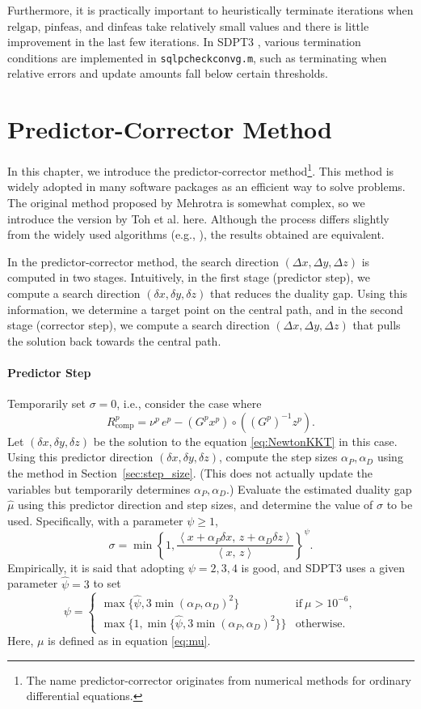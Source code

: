 \documentclass{scrartcl}
\newcommand{\inprod}[2]{\left\langle #1, \, #2 \right\rangle}
\begin{document}
Furthermore, it is practically important to heuristically terminate iterations when $\mathrm{relgap}$, $\mathrm{pinfeas}$, and $\mathrm{dinfeas}$ take relatively small values and there is little improvement in the last few iterations.
In SDPT3 \cite{toh1999}, various termination conditions are implemented in \texttt{sqlpcheckconvg.m}, such as terminating when relative errors and update amounts fall below certain thresholds.




\section{Predictor-Corrector Method}
In this chapter, we introduce the predictor-corrector method\footnote{The name predictor-corrector originates from numerical methods for ordinary differential equations.}.
This method is widely adopted in many software packages as an efficient way to solve problems.
The original method proposed by Mehrotra \cite{Mehrotra1992} is somewhat complex, so we introduce the version by Toh et al. \cite{toh1999} here.
Although the process differs slightly from the widely used algorithms (e.g., \cite{Wright1997}), the results obtained are equivalent.

In the predictor-corrector method, the search direction $(\Delta x, \Delta y, \Delta z)$ is computed in two stages.
Intuitively, in the first stage (predictor step), we compute a search direction $(\delta x, \delta y, \delta z)$ that reduces the duality gap.
Using this information, we determine a target point on the central path, and in the second stage (corrector step), we compute a search direction $(\Delta x, \Delta y, \Delta z)$ that pulls the solution back towards the central path.

\paragraph{Predictor Step}
Temporarily set $\sigma=0$, i.e., consider the case where
\[R^p_{\mathrm{comp}}=\nu^p \, e^p - (G^p x^p) \circ ((G^p)^{-1} z^p).\]
Let $(\delta x, \delta y, \delta z)$ be the solution to the equation \eqref{eq:NewtonKKT} in this case.
Using this predictor direction $(\delta x, \delta y, \delta z)$, compute the step sizes $\alpha_P, \alpha_D$ using the method in Section~\ref{sec:step_size}.
(This does not actually update the variables but temporarily determines $\alpha_P, \alpha_D$.)
Evaluate the estimated duality gap $\hat{\mu}$ using this predictor direction and step sizes, and determine the value of $\sigma$ to be used.
Specifically, with a parameter $\psi \ge 1$,
\[
   \sigma=\min\left\{1, \frac{\inprod{x + \alpha_P \delta x}{z + \alpha_D \delta z}}{\inprod{x}{z}}\right\}^\psi.
\]
Empirically, it is said that adopting $\psi=2,3,4$ is good, and SDPT3 uses a given parameter $\hat{\psi}=3$ to set
\[
\psi = \begin{cases}
    \max\{\hat{\psi}, 3 \min(\alpha_P, \alpha_D)^2\} & \text{if} ~ \mu > 10^{-6}, \\
    \max\{1, \min\{\hat{\psi}, 3 \min(\alpha_P, \alpha_D)^2\}\} & \text{otherwise}.
\end{cases}
\]
Here, $\mu$ is defined as in equation \eqref{eq:mu}.
\end{document}
